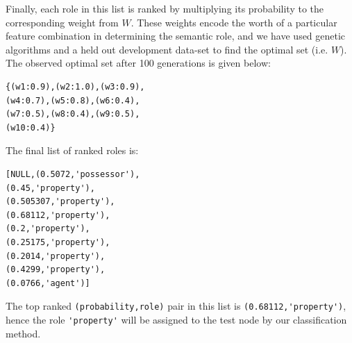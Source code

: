 \documentclass[11pt]{article}
\begin{document}
Finally, each role in this list is ranked by multiplying its probability to the corresponding weight from $W$. These weights encode the worth of a particular feature combination in determining the semantic role, and we have used genetic algorithms and a held out development data-set to find the optimal set (i.e. $W$). The observed optimal set after 100 generations is given below:
\begin{verbatim}
{(w1:0.9),(w2:1.0),(w3:0.9),
(w4:0.7),(w5:0.8),(w6:0.4),
(w7:0.5),(w8:0.4),(w9:0.5),
(w10:0.4)} 
\end{verbatim}
The final list of ranked roles is:
\begin{verbatim}
[NULL,(0.5072,'possessor'),
(0.45,'property'),
(0.505307,'property'),
(0.68112,'property'),
(0.2,'property'),
(0.25175,'property'),
(0.2014,'property'),
(0.4299,'property'),
(0.0766,'agent')]
\end{verbatim}
The top ranked \verb+(probability,role)+ pair in this list is \verb+(0.68112,'property')+, hence the role \verb+'property'+ will be assigned to the test node by our classification method.
\end{document}
